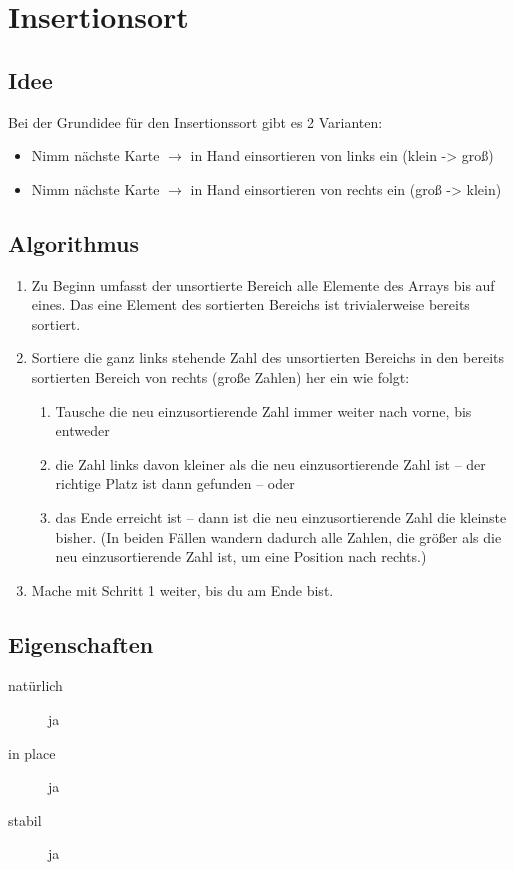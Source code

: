\documentclass{book}
\begin{document}
\section{Insertionsort}
\subsection{Idee}
Bei der Grundidee für den Insertionssort gibt es 2 Varianten:
\begin{itemize}
	\item Nimm nächste Karte $\rightarrow$ in Hand einsortieren von links ein (klein -> groß)
	\item Nimm nächste Karte $\rightarrow$ in Hand einsortieren von rechts ein (groß -> klein) 
\end{itemize}
\subsection{Algorithmus} 
\begin{enumerate}
    \item Zu Beginn umfasst der unsortierte Bereich alle Elemente des Arrays bis auf eines. Das eine Element des sortierten Bereichs ist trivialerweise bereits sortiert.
    \item Sortiere die ganz links stehende Zahl des unsortierten Bereichs in den bereits sortierten Bereich von rechts (große Zahlen) her ein wie folgt:
        \begin{enumerate}
            \item Tausche die neu einzusortierende Zahl immer weiter nach vorne, bis entweder
            \item die Zahl links davon kleiner als die neu einzusortierende Zahl ist – der richtige Platz ist dann gefunden – oder
            \item das Ende erreicht ist – dann ist die neu einzusortierende Zahl die kleinste bisher. (In beiden Fällen wandern dadurch alle Zahlen, die größer als die neu einzusortierende Zahl ist, um eine Position nach rechts.)
        \end{enumerate}
    \item Mache mit Schritt 1 weiter, bis du am Ende bist.
\end{enumerate}

\subsection{Eigenschaften}
\begin{description}
	\item[natürlich] ja
	\item[in place] ja
	\item[stabil] ja  
\end{description}
\end{document}
